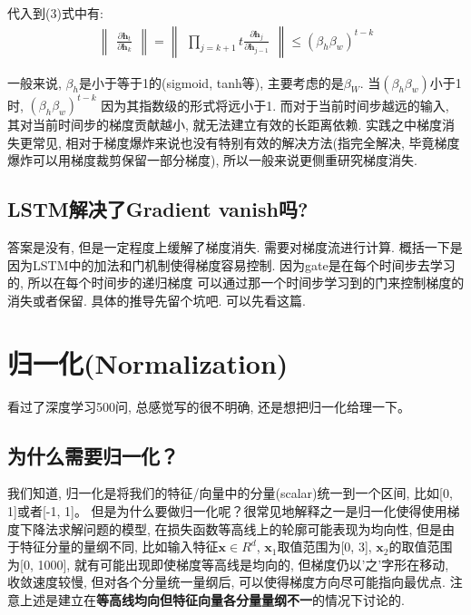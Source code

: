 \documentclass{article}
\begin{document}
代入到(3)式中有:
\begin{align*}
    \begin{Vmatrix}
        \frac{\partial \textbf{h}_t}{\partial \textbf{h}_{k}}
    \end{Vmatrix}
    =
    \begin{Vmatrix}
        \prod_{j=k+1}{t} \frac{\partial \textbf{h}_j}{\partial \textbf{h}_{j-1}}
    \end{Vmatrix}
    \leq (\beta_h \beta_w)^{t-k}
\end{align*}

一般来说, $\beta_h$是小于等于1的(sigmoid, tanh等), 主要考虑的是$\beta_W$. 当$(\beta_h \beta_w)$小于1时, 
$(\beta_h \beta_w)^{t-k}$ 因为其指数级的形式将远小于1. 而对于当前时间步越远的输入, 其对当前时间步的梯度贡献越小, 就无法建立有效的长距离依赖.
实践之中梯度消失更常见, 相对于梯度爆炸来说也没有特别有效的解决方法(指完全解决, 毕竟梯度爆炸可以用梯度裁剪保留一部分梯度), 所以一般来说更侧重研究梯度消失.

\subsection{LSTM解决了Gradient vanish吗?}
答案是没有, 但是一定程度上缓解了梯度消失. 需要对梯度流进行计算. 
概括一下是因为LSTM中的加法和门机制使得梯度容易控制. 因为gate是在每个时间步去学习的, 所以在每个时间步的递归梯度
可以通过那一个时间步学习到的门来控制梯度的消失或者保留. 具体的推导先留个坑吧. 可以先看这篇. 




\section{归一化(Normalization)}

看过了深度学习500问, 总感觉写的很不明确, 还是想把归一化给理一下。

\subsection{为什么需要归一化？}


我们知道, 归一化是将我们的特征/向量中的分量(scalar)统一到一个区间, 比如[0, 1]或者[-1, 1]。
但是为什么要做归一化呢？很常见地解释之一是归一化使得使用梯度下降法求解问题的模型, 在损失函数等高线上的轮廓可能表现为均向性,
但是由于特征分量的量纲不同, 比如输入特征$\textbf{x} \in R^d$, $\textbf{x}_1$取值范围为[0, 3],
$\textbf{x}_2$的取值范围为[0, 1000], 就有可能出现即使梯度等高线是均向的, 但梯度仍以'之'字形在移动, 收敛速度较慢,
但对各个分量统一量纲后, 可以使得梯度方向尽可能指向最优点. 注意上述是建立在\textbf{等高线均向但特征向量各分量量纲不一}的情况下讨论的.
\end{document}
